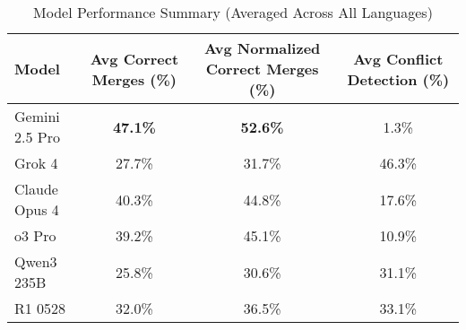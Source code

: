 \begin{table}[htbp]
\centering
\caption{Model Performance Summary (Averaged Across All Languages)}
\label{tab:model_performance_summary}
\begin{tabular}{|l|c|c|c|}
\hline
\textbf{Model} & \textbf{Avg Correct Merges (\%)} & \textbf{Avg Normalized Correct Merges (\%)} & \textbf{Avg Conflict Detection (\%)} \\
\hline
Gemini 2.5 Pro & \textbf{47.1\%} & \textbf{52.6\%} & 1.3\% \\
Grok 4 & 27.7\% & 31.7\% & 46.3\% \\
Claude Opus 4 & 40.3\% & 44.8\% & 17.6\% \\
o3 Pro & 39.2\% & 45.1\% & 10.9\% \\
Qwen3 235B & 25.8\% & 30.6\% & 31.1\% \\
R1 0528 & 32.0\% & 36.5\% & 33.1\% \\
\hline
\end{tabular}
\end{table}
